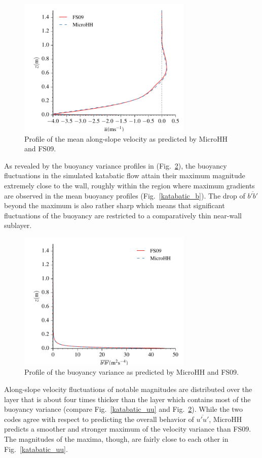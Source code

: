 \documentclass[gmd]{copernicus}
\begin{document}
\begin{figure}
	\centerline{\includegraphics[width=8.3cm]{figs/katabatic_u.pdf}}
	\caption{Profile of the mean along-slope velocity as predicted by MicroHH and FS09.}
	\label{katabatic_u}
\end{figure}

As revealed by the buoyancy variance profiles in (Fig.~\ref{katabatic_bb}), the buoyancy fluctuations in the simulated katabatic flow attain their maximum magnitude extremely close to the wall, roughly within the region where maximum gradients are observed in the mean buoyancy profiles (Fig.~\ref{katabatic_b}). The drop of $\overline{b'b'}$ beyond the maximum is also rather sharp which means that significant fluctuations of the buoyancy are restricted to a comparatively thin near-wall sublayer.

\begin{figure}
	\centerline{\includegraphics[width=8.3cm]{figs/katabatic_bb.pdf}}
	\caption{Profile of the buoyancy variance as predicted by MicroHH and FS09.}
	\label{katabatic_bb}
\end{figure}

Along-slope velocity fluctuations of notable magnitudes are distributed over the layer that is about four times thicker than the layer which contains most of the buoyancy variance (compare Fig.~\ref{katabatic_uu} and Fig.~\ref{katabatic_bb}). While the two codes agree with respect to predicting the overall behavior of $\overline{u'u'}$, MicroHH predicts a smoother and stronger maximum of the velocity variance than FS09. The magnitudes of the maxima, though, are fairly close to each other in Fig.~\ref{katabatic_uu}.
\end{document}
